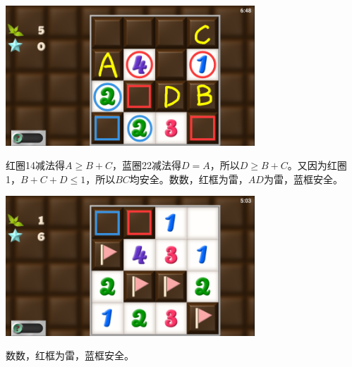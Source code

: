 \subsection{} %
\begin{center}
    \includegraphics[width=0.7\textwidth]{puzzle/76-1.png}
\end{center}
红圈14减法得$A\ge B+C$，蓝圈22减法得$D=A$，所以$D\ge B+C$。又因为红圈1，$B+C+D\le 1$，所以$BC$均安全。数数，红框为雷，$AD$为雷，蓝框安全。
\begin{center}
    \includegraphics[width=0.7\textwidth]{puzzle/76-2.png}
\end{center}
数数，红框为雷，蓝框安全。

